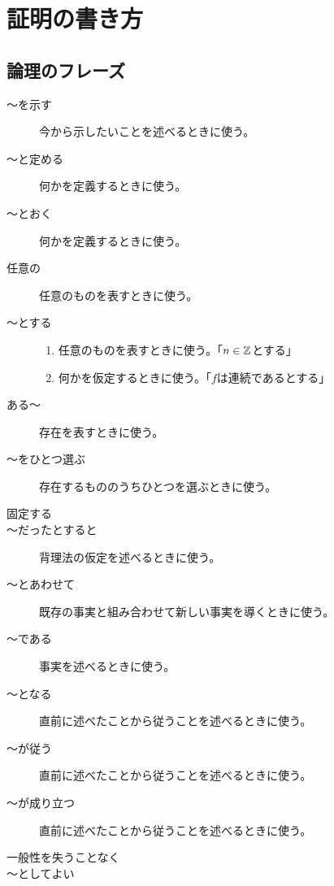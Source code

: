 \documentclass[report]{jlreq}
\begin{document}
%
\chapter{証明の書き方}

%
\section{論理のフレーズ}

\begin{description}
    \item[〜を示す]
        今から示したいことを述べるときに使う。
    \item[〜と定める]
        何かを定義するときに使う。
    \item[〜とおく]
        何かを定義するときに使う。
    \item[任意の]
        任意のものを表すときに使う。
    \item[〜とする]
        \begin{enumerate}
            \item 任意のものを表すときに使う。「$n \in \mathbb{Z}$とする」
            \item 何かを仮定するときに使う。「$f$は連続であるとする」
        \end{enumerate}
    \item[ある〜]
        存在を表すときに使う。
    \item[〜をひとつ選ぶ]
        存在するもののうちひとつを選ぶときに使う。
    \item[固定する]
    \item[〜だったとすると]
        背理法の仮定を述べるときに使う。
    \item[〜とあわせて]
        既存の事実と組み合わせて新しい事実を導くときに使う。
    \item[〜である]
        事実を述べるときに使う。
    \item[〜となる]
        直前に述べたことから従うことを述べるときに使う。
    \item[〜が従う]
        直前に述べたことから従うことを述べるときに使う。
    \item[〜が成り立つ]
        直前に述べたことから従うことを述べるときに使う。
    \item[一般性を失うことなく]
    \item[〜としてよい]
\end{description}
\end{document}

